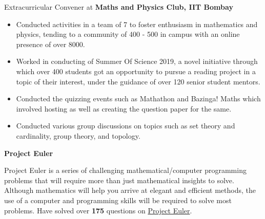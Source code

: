 
\begin{rubric}{Extracurricular}
\entry*[] Convener at \textbf{Maths and Physics Club, IIT Bombay}
\vspace{-2mm}
\begin{itemize}%
	\setlength\itemsep{-0.4em}
    \item Conducted activities in a team of 7 to foster enthusiasm in mathematics and physics, tending to a community of 400 - 500 in campus with an online presence of over 8000.
    \item Worked in conducting of Summer Of Science 2019, a novel initiative through which over 400 students got an opportunity to pursue a reading project in a topic of their interest, under the guidance of over 120 senior student mentors.
    \item Conducted the quizzing events such as Mathathon and Bazinga! Maths which involved hosting as well as creating the question paper for the same. 
    \item Conducted various group discussions on topics such as set theory and cardinality, group theory, and topology. \vspace{-5mm}
\end{itemize}
%


%
\entry*[] \textbf{Project Euler}

Project Euler is a series of challenging mathematical/computer programming problems that will require more than just mathematical insights to solve. Although mathematics will help you arrive at elegant and efficient methods, the use of a computer and programming skills will be required to solve most problems. Have solved over \textbf{175} questions on \href{https://projecteuler.net/}{Project Euler}.
\end{rubric}